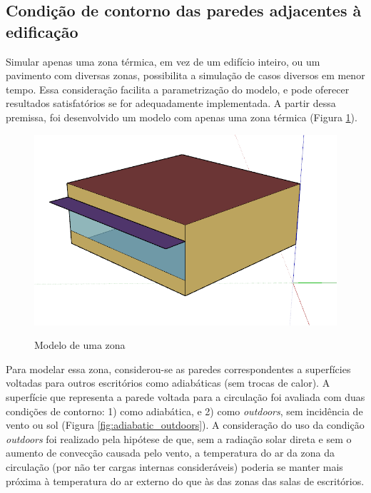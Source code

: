 \subsection*{Condição de contorno das paredes adjacentes à edificação}

Simular apenas uma zona térmica, em vez de um edifício inteiro, ou um pavimento com diversas zonas, possibilita a simulação de casos diversos em menor tempo.
Essa consideração facilita a parametrização do modelo, e pode oferecer resultados satisfatórios se for adequadamente implementada.
A partir dessa premissa, foi desenvolvido um modelo com apenas uma zona térmica (Figura \ref{fig:singlezone}).

\begin{figure}[h]
	\centering
	\caption{Modelo de uma zona}
	\includegraphics[width=\figsize\linewidth]{img/model.PNG}
	\label{fig:singlezone}
\end{figure}

Para modelar essa zona, considerou-se as paredes correspondentes a superfícies voltadas para outros escritórios como adiabáticas (sem trocas de calor). A superfície que representa a parede voltada para a circulação foi avaliada com duas condições de contorno: 1) como adiabática, e 2) como \textit{outdoors}, sem incidência de vento ou sol (Figura \ref{fig:adiabatic_outdoors}).	
A consideração do uso da condição \textit{outdoors} foi realizado pela hipótese de que, sem a radiação solar direta e sem o aumento de convecção causada pelo vento, a temperatura do ar da zona da circulação (por não ter cargas internas consideráveis) poderia se manter mais próxima à temperatura do ar externo do que às das zonas das salas de escritórios.


